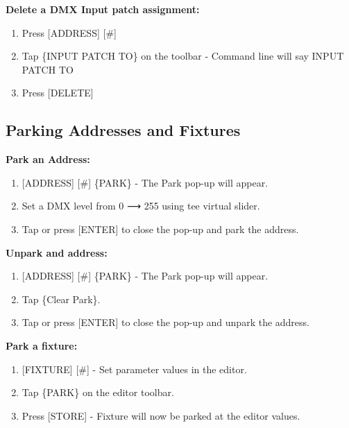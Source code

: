 \documentclass[
]{article}
\begin{document}
\textbf{Delete a DMX Input patch assignment:}

\begin{enumerate}
\def\labelenumi{\arabic{enumi}.}
\item
  Press {[}ADDRESS{]} {[}\#{]}
\item
  Tap \{INPUT PATCH TO\} on the toolbar - Command line will say INPUT PATCH TO
\item
  Press {[}DELETE{]}
\end{enumerate}

\hypertarget{parking-addresses-and-fixtures}{%
\subsection{Parking Addresses and Fixtures}\label{parking-addresses-and-fixtures}}

\textbf{Park an Address:}

\begin{enumerate}
\def\labelenumi{\arabic{enumi}.}
\item
  {[}ADDRESS{]} {[}\#{]} \{PARK\} - The Park pop-up will appear.
\item
  Set a DMX level from 0 ⟶ 255 using tee virtual slider.
\item
  Tap \href{image.png}{} or press {[}ENTER{]} to close the pop-up and park the address.
\end{enumerate}

\textbf{Unpark and address:}

\begin{enumerate}
\def\labelenumi{\arabic{enumi}.}
\item
  {[}ADDRESS{]} {[}\#{]} \{PARK\} - The Park pop-up will appear.
\item
  Tap \{Clear Park\}.
\item
  Tap \href{image.png}{} or press {[}ENTER{]} to close the pop-up and unpark the address.
\end{enumerate}

\textbf{Park a fixture:}

\begin{enumerate}
\def\labelenumi{\arabic{enumi}.}
\item
  {[}FIXTURE{]} {[}\#{]} - Set parameter values in the editor.
\item
  Tap \{PARK\} on the editor toolbar.
\item
  Press {[}STORE{]} - Fixture will now be parked at the editor values.
\end{enumerate}
\end{document}
